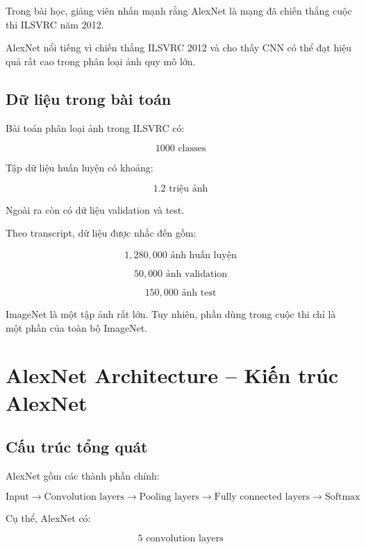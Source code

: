 Trong bài học, giảng viên nhấn mạnh rằng AlexNet là mạng đã chiến thắng cuộc thi ILSVRC năm 2012.

\begin{ghinho}
AlexNet nổi tiếng vì chiến thắng ILSVRC 2012 và cho thấy CNN có thể đạt hiệu quả rất cao trong phân loại ảnh quy mô lớn.
\end{ghinho}

\subsection{Dữ liệu trong bài toán}

Bài toán phân loại ảnh trong ILSVRC có:

\[
    1000 \text{ classes}
\]

Tập dữ liệu huấn luyện có khoảng:

\[
    1.2 \text{ triệu ảnh}
\]

Ngoài ra còn có dữ liệu validation và test.

Theo transcript, dữ liệu được nhắc đến gồm:

\[
    1{,}280{,}000 \text{ ảnh huấn luyện}
\]

\[
    50{,}000 \text{ ảnh validation}
\]

\[
    150{,}000 \text{ ảnh test}
\]

\begin{luuy}
ImageNet là một tập ảnh rất lớn. Tuy nhiên, phần dùng trong cuộc thi chỉ là một phần của toàn bộ ImageNet.
\end{luuy}

\section{AlexNet Architecture -- Kiến trúc AlexNet}

\subsection{Cấu trúc tổng quát}

AlexNet gồm các thành phần chính:

\[
    \text{Input}
    \rightarrow
    \text{Convolution layers}
    \rightarrow
    \text{Pooling layers}
    \rightarrow
    \text{Fully connected layers}
    \rightarrow
    \text{Softmax}
\]

Cụ thể, AlexNet có:

\[
    5 \text{ convolution layers}
\]

